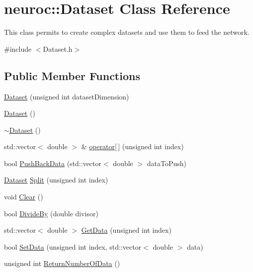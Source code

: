 \hypertarget{classneuroc_1_1_dataset}{\section{neuroc\-:\-:Dataset Class Reference}
\label{classneuroc_1_1_dataset}
}


This class permits to create complex datasets and use them to feed the network.  




{\ttfamily \#include $<$Dataset.\-h$>$}

\subsection*{Public Member Functions}
\begin{DoxyCompactItemize}
\item 
\hyperlink{classneuroc_1_1_dataset_a58c2264c9b5d1b921f0220e334663773}{Dataset} (unsigned int dataset\-Dimension)
\item 
\hyperlink{classneuroc_1_1_dataset_a9d337786be09e336d74fb85c5ba7a176}{Dataset} ()
\item 
\hyperlink{classneuroc_1_1_dataset_ab2adb60669c1b81880c185a5e018089b}{$\sim$\-Dataset} ()
\item 
std\-::vector$<$ double $>$ \& \hyperlink{classneuroc_1_1_dataset_a4ff3b2849a1b9828197c99e386b5090d}{operator\mbox{[}$\,$\mbox{]}} (unsigned int index)
\item 
bool \hyperlink{classneuroc_1_1_dataset_a2e39158b15c4c75b1cd471b0c704d5b9}{Push\-Back\-Data} (std\-::vector$<$ double $>$ data\-To\-Push)
\item 
\hyperlink{classneuroc_1_1_dataset}{Dataset} \hyperlink{classneuroc_1_1_dataset_a38b4f7abc368ea88f7ff19aacea22578}{Split} (unsigned int index)
\item 
void \hyperlink{classneuroc_1_1_dataset_adc6f41be9dd1fd537869fba1254d828d}{Clear} ()
\item 
bool \hyperlink{classneuroc_1_1_dataset_a619a95b24052ee00ad4746b3221d4ede}{Divide\-By} (double divisor)
\item 
std\-::vector$<$ double $>$ \hyperlink{classneuroc_1_1_dataset_a261749c693828feb6dae1789b1ff3d3b}{Get\-Data} (unsigned int index)
\item 
bool \hyperlink{classneuroc_1_1_dataset_ab8e9e39eb91f6c13a3231d8f9794ccc5}{Set\-Data} (unsigned int index, std\-::vector$<$ double $>$ data)
\item 
unsigned int \hyperlink{classneuroc_1_1_dataset_a65b3e8dc12f70648643932bd1795a22c}{Return\-Number\-Of\-Data} ()

\end{DoxyCompactItemize}
